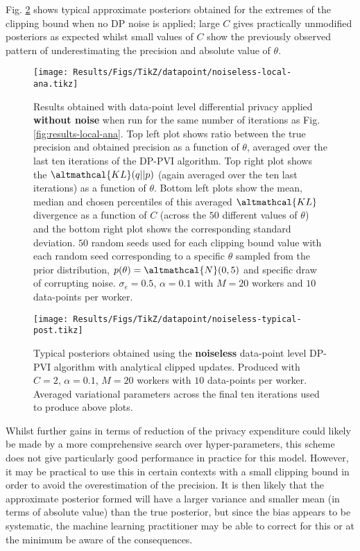  Fig. \ref{fig:results-noiseless-typical-post} shows typical approximate posteriors obtained for the extremes of the clipping bound when no DP noise is applied; large $C$ gives practically unmodified posteriors as expected whilst small values of $C$ show the previously observed pattern of underestimating the precision and absolute value of $\theta$.

\begin{figure}
	\texttt{[image: Results/Figs/TikZ/datapoint/noiseless-local-ana.tikz]}
	\centering
	\caption{\label{fig:results-noiseless-local-ana} Results obtained with data-point level differential privacy applied \textbf{without noise} when run for the same number of iterations as Fig. \ref{fig:results-local-ana}. Top left plot shows ratio between the true precision and obtained precision as a function of $\theta$, averaged over the last ten iterations of the DP-PVI algorithm. Top right plot shows the $\altmathcal{KL}(q||p)$ (again averaged over the ten last iterations) as a function of $\theta$. Bottom left plots show the mean, median and chosen percentiles of this averaged $\altmathcal{KL}$ divergence as a function of $C$ (across the $50$ different values of $\theta$) and the bottom right plot shows the corresponding standard deviation. $50$ random seeds used for each clipping bound value with each random seed corresponding to a specific $\theta$ sampled from the prior distribution, $p(\theta) = \altmathcal{N}(0, 5)$ and specific draw of corrupting noise. $\sigma_e = 0.5$, $\alpha=0.1$ with $M=20$ workers and $10$ data-points per worker. }
\end{figure}

\begin{figure}
	\texttt{[image: Results/Figs/TikZ/datapoint/noiseless-typical-post.tikz]}
	\centering
	\caption{\label{fig:results-noiseless-typical-post} Typical posteriors obtained using the \textbf{noiseless} data-point level DP-PVI algorithm with analytical clipped updates. Produced with $C=2$, $\alpha=0.1$, $M=20$ workers with $10$ data-points per worker. Averaged variational parameters across the final ten iterations used to produce above plots.}
\end{figure}

Whilst further gains in terms of reduction of the privacy expenditure could likely be made by a more comprehensive search over hyper-parameters, this scheme does not give particularly good performance in practice for this model. However, it may be practical to use this in certain contexts with a small clipping bound in order to avoid the overestimation of the precision. It is then likely that the approximate posterior formed will have a larger variance and smaller mean (in terms of absolute value) than the true posterior, but since the bias appears to be systematic, the machine learning practitioner may be able to correct for this or at the minimum be aware of the consequences. 

